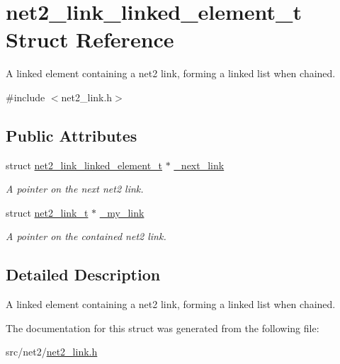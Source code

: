 \hypertarget{structnet2__link__linked__element__t}{}\section{net2\+\_\+link\+\_\+linked\+\_\+element\+\_\+t Struct Reference}
\label{structnet2__link__linked__element__t}


A linked element containing a net2 link, forming a linked list when chained.  




{\ttfamily \#include $<$net2\+\_\+link.\+h$>$}

\subsection*{Public Attributes}
\begin{DoxyCompactItemize}
\item 
\hypertarget{structnet2__link__linked__element__t_a167564acaf196fac9ae24b3192367b33}{}struct \hyperlink{structnet2__link__linked__element__t}{net2\+\_\+link\+\_\+linked\+\_\+element\+\_\+t} $\ast$ \hyperlink{structnet2__link__linked__element__t_a167564acaf196fac9ae24b3192367b33}{\+\_\+next\+\_\+link}\label{structnet2__link__linked__element__t_a167564acaf196fac9ae24b3192367b33}

\begin{DoxyCompactList}\small\item\em A pointer on the next net2 link. \end{DoxyCompactList}\item 
\hypertarget{structnet2__link__linked__element__t_a9259dac034e68a1681460c73581072b7}{}struct \hyperlink{structnet2__link__t}{net2\+\_\+link\+\_\+t} $\ast$ \hyperlink{structnet2__link__linked__element__t_a9259dac034e68a1681460c73581072b7}{\+\_\+my\+\_\+link}\label{structnet2__link__linked__element__t_a9259dac034e68a1681460c73581072b7}

\begin{DoxyCompactList}\small\item\em A pointer on the contained net2 link. \end{DoxyCompactList}\end{DoxyCompactItemize}


\subsection{Detailed Description}
A linked element containing a net2 link, forming a linked list when chained. 

The documentation for this struct was generated from the following file\+:\begin{DoxyCompactItemize}
\item 
src/net2/\hyperlink{net2__link_8h}{net2\+\_\+link.\+h}\end{DoxyCompactItemize}
